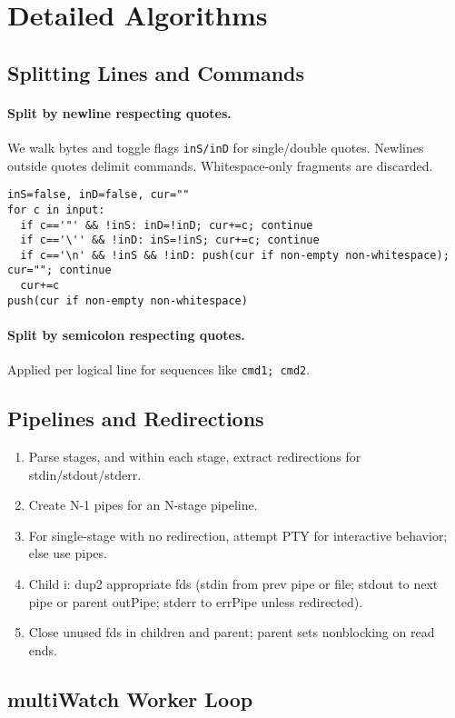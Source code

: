 \documentclass[11pt,a4paper]{article}
\begin{document}
\section{Detailed Algorithms}
\subsection{Splitting Lines and Commands}
\paragraph{Split by newline respecting quotes.} We walk bytes and toggle flags \texttt{inS/inD} for single/double quotes. Newlines outside quotes delimit commands. Whitespace-only fragments are discarded.
\begin{lstlisting}[style=code]
inS=false, inD=false, cur=""
for c in input:
  if c=='"' && !inS: inD=!inD; cur+=c; continue
  if c=='\'' && !inD: inS=!inS; cur+=c; continue
  if c=='\n' && !inS && !inD: push(cur if non-empty non-whitespace); cur=""; continue
  cur+=c
push(cur if non-empty non-whitespace)
\end{lstlisting}

\paragraph{Split by semicolon respecting quotes.} Applied per logical line for sequences like \verb!cmd1; cmd2!.

\subsection{Pipelines and Redirections}
\begin{enumerate}[leftmargin=*]
  \item Parse stages, and within each stage, extract redirections for stdin/stdout/stderr.
  \item Create N-1 pipes for an N-stage pipeline.
  \item For single-stage with no redirection, attempt PTY for interactive behavior; else use pipes.
  \item Child i: dup2 appropriate fds (stdin from prev pipe or file; stdout to next pipe or parent outPipe; stderr to errPipe unless redirected).
  \item Close unused fds in children and parent; parent sets nonblocking on read ends.
\end{enumerate}

\subsection{multiWatch Worker Loop}
\end{document}
